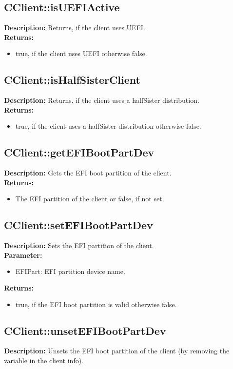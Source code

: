 \subsection{CClient::isUEFIActive}
\textbf{Description:} Returns, if the client uses UEFI.\\
\textbf{Returns:}
\begin{itemize}
\item true, if the client uses UEFI otherwise false.
\end{itemize}

\subsection{CClient::isHalfSisterClient}
\textbf{Description:} Returns, if the client uses a halfSister distribution.\\
\textbf{Returns:}
\begin{itemize}
\item true, if the client uses a halfSister distribution otherwise false.
\end{itemize}

\subsection{CClient::getEFIBootPartDev}
\textbf{Description:} Gets the EFI boot partition of the client.\\
\textbf{Returns:}
\begin{itemize}
\item The EFI partition of the client or false, if not set.
\end{itemize}

\subsection{CClient::setEFIBootPartDev}
\textbf{Description:} Sets the EFI partition of the client.\\
\textbf{Parameter:}
\begin{itemize}
\item EFIPart: EFI partition device name.
\end{itemize}
\textbf{Returns:}
\begin{itemize}
\item true, if the EFI boot partition is valid otherwise false.
\end{itemize}

\subsection{CClient::unsetEFIBootPartDev}
\textbf{Description:} Unsets the EFI boot partition of the client (by removing the variable in the client info).\\

